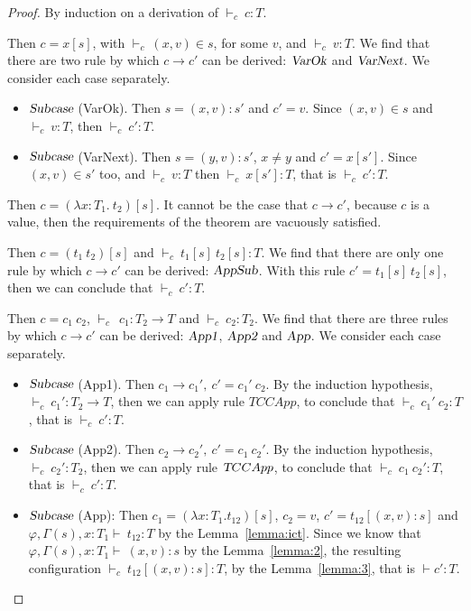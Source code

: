 \documentclass[preprint,authoryear,sort&compress,9pt,nocopyrightspace]{article}
\newcommand{\tto}{\longrightarrow}
\newcommand{\conf}[2][s]{(#2)[#1]}
\newcommand{\confx}[1]{#1 [(x,v):s]}
\newcommand{\SubxD}{(x,v):s}
\newcommand{\Subx}{(x,v):s'}
\newcommand{\Suby}{(y,v):s'}
\newcommand{\envEC}{{\emt, \Gamma(s) , x:T_1 \vdash \ }}
\newcommand{\tyC}{{\vdash_c \ }}
\newcommand{\absD}{\lambda x:T_1. \ t_2}
\newcommand{\emt}{\varphi}
\begin{document}
\begin{proof} By induction on a derivation of $\tyC c : T$.


\begin{case}[TCVar]
Then $c = x[s]$, with $\tyC (x,v) \in s$, for some $v$, and $\tyC v:T$. We find that there are two rule by which $c \tto c'$ can be derived: $\textsl {VarOk}$ and $\textsl {VarNext}$. We consider each case separately.
\begin{itemize}
\item $\textsl{Subcase}$ (VarOk). Then $s = \Subx$ and $c' = v$. Since $(x,v) \in s$ and $\tyC v:T$, then $\tyC c' : T$.

\item $\textsl{Subcase}$ (VarNext). Then $s = \Suby$, $x \neq y$ and $c' = x[s']$. Since $(x,v) \in s'$ too, and $\tyC v:T$ then $\tyC x[s']:T $, that is $\tyC c' : T$. 
\end{itemize}
\end{case}

\begin{case} [TAbs]
Then $c = \conf{\absD}$. It cannot be the case that $c \tto c'$, because $c$ is a value, then the requirements of the theorem are vacuously satisfied. 
\end{case}

\begin{case}[TCApp]
Then $c = \conf{t_1 \ t_2}$ and $\tyC t_1[s] \ t_2[s]: T$. We find that there are only one rule by which $c \tto c'$ can be derived: $\textsl {AppSub}$. With this rule $c' = t_1[s] \ t_2[s]$, then we can conclude that $\tyC c' : T$. 
\end{case}

\begin{case} [TCCApp]
Then $c = c_1 \ c_2$, $\tyC \ c_1 : T_2 \to T$ and $\tyC c_2 : T_2$. We find that there are three rules by which $c \tto c'$ can be derived: $\textsl {App1}$, $\textsl {App2}$ and $\textsl {App}$. We consider each case separately.
\begin{itemize}

\item $\textsl{Subcase}$ (App1). Then $c_1 \tto c_1', \ c' = c_1' \ c_2$. By the induction hypothesis, $\tyC c_1' : T_2 \to T$, then we can apply rule $TCCApp$, to conclude that $\tyC c_1' \ c_2: T$ , that is $\tyC c' : T$.

\item $\textsl{Subcase}$ (App2). Then $c_2 \tto c_2', \ c' = c_1 \ c_2'$. By the induction hypothesis, $\tyC c_2' : T_2 $, then we can apply rule $\textsl TCCApp$, to conclude that $\tyC c_1 \ c_2' : T$, that is $\tyC c' : T$.

\item $\textsl{Subcase}$ (App): Then $c_1 = \conf{\lambda x:T_{1}.t_{12}}$, $c_2 = v$, $c' = \confx{t_{12}}$ and $\envEC t_{12}: T$ by the Lemma~\ref{lemma:ict}. Since we know that $\envEC \SubxD$ by the Lemma~\ref{lemma:2}, the resulting configuration $\tyC \confx{t_{12}}:T$, by the Lemma~\ref{lemma:3}, that is $\vdash c' : T$.
\end{itemize}
\end{case}
\end{proof}
\end{document}
